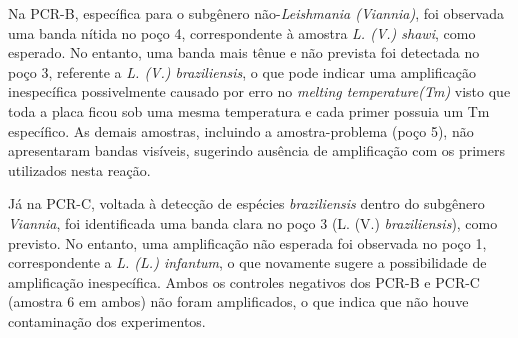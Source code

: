 Na PCR-B, específica para o subgênero não-\textit{Leishmania (Viannia)}, foi observada uma banda nítida no poço 4, correspondente à amostra \textit{L. (V.) shawi}, como esperado. 
No entanto, uma banda mais tênue e não prevista foi detectada no poço 3, referente a \textit{L. (V.) braziliensis}, o que pode indicar uma amplificação inespecífica possivelmente causado
por erro no \textit{melting temperature(Tm)} visto que toda a placa ficou sob uma mesma temperatura e cada primer possuia um Tm específico. As demais amostras, incluindo a amostra-problema 
(poço 5), não apresentaram bandas visíveis, sugerindo ausência de amplificação com os primers utilizados nesta reação.

Já na PCR-C, voltada à detecção de espécies \textit{braziliensis} dentro do subgênero \textit{Viannia}, foi identificada uma banda clara no poço 3 (L. (V.) \textit{braziliensis}), 
como previsto. No entanto, uma amplificação não esperada foi observada no poço 1, correspondente a \textit{L. (L.) infantum}, o que novamente sugere a possibilidade de amplificação inespecífica.
Ambos os controles negativos dos PCR-B e PCR-C (amostra 6 em ambos) não foram amplificados, o que indica que não houve contaminação dos experimentos.
